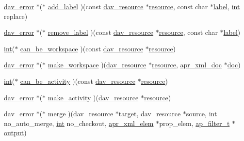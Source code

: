 \begin{DoxyCompactItemize}
\item 
\hyperlink{structdav__error}{dav\+\_\+error} $\ast$($\ast$ \hyperlink{structdav__hooks__vsn_ad501bbf4e45cf171ae12f65caac908d2}{add\+\_\+label} )(const \hyperlink{structdav__resource}{dav\+\_\+resource} $\ast$\hyperlink{group__APR__Util__RL_gaa6244aacafcc4ec1d0727bdb32614b11}{resource}, const char $\ast$\hyperlink{pcregrep_8txt_ad072e9f95bffc33f26ec2d611742f819}{label}, \hyperlink{pcre_8txt_a42dfa4ff673c82d8efe7144098fbc198}{int} replace)
\item 
\hyperlink{structdav__error}{dav\+\_\+error} $\ast$($\ast$ \hyperlink{structdav__hooks__vsn_a2bd175b6fb71488e5a6b270594f637fd}{remove\+\_\+label} )(const \hyperlink{structdav__resource}{dav\+\_\+resource} $\ast$\hyperlink{group__APR__Util__RL_gaa6244aacafcc4ec1d0727bdb32614b11}{resource}, const char $\ast$\hyperlink{pcregrep_8txt_ad072e9f95bffc33f26ec2d611742f819}{label})
\item 
\hyperlink{pcre_8txt_a42dfa4ff673c82d8efe7144098fbc198}{int}($\ast$ \hyperlink{structdav__hooks__vsn_a218a86ae426b1e3cbb214c1c4d754bf3}{can\+\_\+be\+\_\+workspace} )(const \hyperlink{structdav__resource}{dav\+\_\+resource} $\ast$\hyperlink{group__APR__Util__RL_gaa6244aacafcc4ec1d0727bdb32614b11}{resource})
\item 
\hyperlink{structdav__error}{dav\+\_\+error} $\ast$($\ast$ \hyperlink{structdav__hooks__vsn_a538b2e4704c7af2697596fa90be885b6}{make\+\_\+workspace} )(\hyperlink{structdav__resource}{dav\+\_\+resource} $\ast$\hyperlink{group__APR__Util__RL_gaa6244aacafcc4ec1d0727bdb32614b11}{resource}, \hyperlink{structapr__xml__doc}{apr\+\_\+xml\+\_\+doc} $\ast$\hyperlink{group__MOD__DAV_gab79aad8aa27988a0e86b9397d43541e8}{doc})
\item 
\hyperlink{pcre_8txt_a42dfa4ff673c82d8efe7144098fbc198}{int}($\ast$ \hyperlink{structdav__hooks__vsn_a168825429295acfdae39754af51041c9}{can\+\_\+be\+\_\+activity} )(const \hyperlink{structdav__resource}{dav\+\_\+resource} $\ast$\hyperlink{group__APR__Util__RL_gaa6244aacafcc4ec1d0727bdb32614b11}{resource})
\item 
\hyperlink{structdav__error}{dav\+\_\+error} $\ast$($\ast$ \hyperlink{structdav__hooks__vsn_a294b0947b03c9957a60b62ee8f0ccb96}{make\+\_\+activity} )(\hyperlink{structdav__resource}{dav\+\_\+resource} $\ast$\hyperlink{group__APR__Util__RL_gaa6244aacafcc4ec1d0727bdb32614b11}{resource})
\item 
\hyperlink{structdav__error}{dav\+\_\+error} $\ast$($\ast$ \hyperlink{structdav__hooks__vsn_a906acfca8c20b1ecfca9738918e9b409}{merge} )(\hyperlink{structdav__resource}{dav\+\_\+resource} $\ast$target, \hyperlink{structdav__resource}{dav\+\_\+resource} $\ast$\hyperlink{group__apr__mcast_ga9b1b80407da58f6c0654348c017710eb}{source}, \hyperlink{pcre_8txt_a42dfa4ff673c82d8efe7144098fbc198}{int} no\+\_\+auto\+\_\+merge, \hyperlink{pcre_8txt_a42dfa4ff673c82d8efe7144098fbc198}{int} no\+\_\+checkout, \hyperlink{structapr__xml__elem}{apr\+\_\+xml\+\_\+elem} $\ast$prop\+\_\+elem, \hyperlink{structap__filter__t}{ap\+\_\+filter\+\_\+t} $\ast$\hyperlink{pcretest_8txt_acf47d950a4853a501d6b975b394de5e5}{output})

\end{DoxyCompactItemize}

